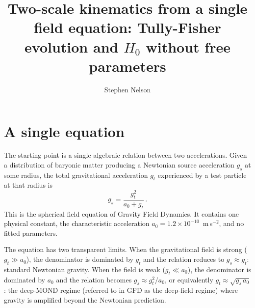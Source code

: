 \documentclass[a4paper,11pt]{article}
\title{\boldmath Two-scale kinematics from a single field equation:
Tully-Fisher evolution and $H_0$ without free parameters}
\author[a]{Stephen Nelson}
\affiliation[a]{Field Dynamics Research\\
\texttt{stephen@fielddynamics.org}\\
ORCID: 0009-0008-6190-3269}
\begin{document}
\maketitle
\flushbottom

\section{A single equation}
\label{sec:equation}

The starting point is a single algebraic relation between two accelerations. Given a distribution of baryonic matter producing a Newtonian source acceleration $g_s$ at some radius, the total gravitational acceleration $g_t$ experienced by a test particle at that radius is
\begin{equation}
g_s = \frac{g_t^2}{a_0 + g_t}\,.
\label{eq:sst}
\end{equation}
This is the spherical field equation of Gravity Field Dynamics. It contains one physical constant, the characteristic acceleration $a_0 = 1.2 \times 10^{-10}$~m\,s$^{-2}$, and no fitted parameters.

The equation has two transparent limits. When the gravitational field is strong ($g_t \gg a_0$), the denominator is dominated by $g_t$ and the relation reduces to $g_s \approx g_t$: standard Newtonian gravity. When the field is weak ($g_t \ll a_0$), the denominator is dominated by $a_0$ and the relation becomes $g_s \approx g_t^2/a_0$, or equivalently $g_t \approx \sqrt{g_s\, a_0}$: the deep-MOND regime (referred to in GFD as the deep-field regime) where gravity is amplified beyond the Newtonian prediction.
\end{document}
